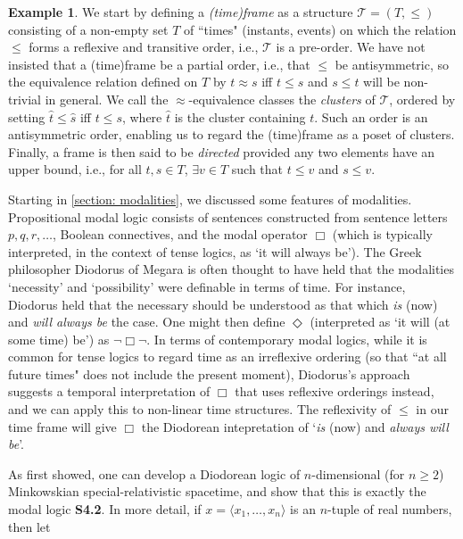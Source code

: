 \documentclass[11pt]{book}
\theoremstyle{definition}
\newtheorem{example}{Example}[section]
\theoremstyle{definition}
\theoremstyle{definition}
\theoremstyle{theorem}
\theoremstyle{definition}
\begin{document}
\begin{example}
	We start by defining a \textit{(time)frame} as a structure $\mathcal{T} = (T, \leq)$ consisting of a non-empty set $T$ of ``times" (instants, events) on which the relation $\leq$ forms a reflexive and transitive order, i.e., $\mathcal{T}$ is a pre-order. We have not insisted that a (time)frame be a partial order, i.e., that $\leq$ be antisymmetric, so the equivalence relation defined on $T$ by $t \approx s$ iff $t \leq s$ and $s \leq t$ will be non-trivial in general. We call the $\approx$-equivalence classes the \textit{clusters} of $\mathcal{T}$, ordered by setting $\hat{t} \leq \hat{s}$ iff $t \leq s$, where $\hat{t}$ is the cluster containing $t$. Such an order is an antisymmetric order, enabling us to regard the (time)frame as a poset of clusters. Finally, a frame is then said to be \textit{directed} provided any two elements have an upper bound, i.e., for all $t, s \in T$, $\exists v \in T$ such that $t \leq v$ and $s \leq v$. \par 
	Starting in \ref{section: modalities}, we discussed some features of modalities. Propositional modal logic consists of sentences constructed from sentence letters $p, q, r, \dots$, Boolean connectives, and the modal operator $\Box$ (which is typically interpreted, in the context of tense logics, as `it will always be'). The Greek philosopher Diodorus of Megara is often thought to have held that the modalities `necessity' and `possibility' were definable in terms of time. For instance, Diodorus held that the necessary should be understood as that which \textit{is} (now) and \textit{will always be} the case. One might then define $\Diamond$ (interpreted as `it will (at some time) be') as $\neg \Box \neg$. In terms of contemporary modal logics, while it is common for tense logics to regard time as an irreflexive ordering (so that ``at all future times" does not include the present moment), Diodorus's approach suggests a temporal interpretation of $\Box$ that uses reflexive orderings instead, and we can apply this to non-linear time structures. The reflexivity of $\leq$ in our time frame will give $\Box$ the Diodorean intepretation of `\textit{is} (now) and \textit{always will be}'.  \par 
	As \cite{goldblatt_diodorean_1980} first showed, one can develop a Diodorean logic of $n$-dimensional (for $n \geq 2$) Minkowskian special-relativistic spacetime, and show that this is exactly the modal logic \textbf{S4.2}. In more detail, if $x = \langle x_1, \dots, x_n \rangle$ is an $n$-tuple of real numbers, then let 

\end{example}
\end{document}
